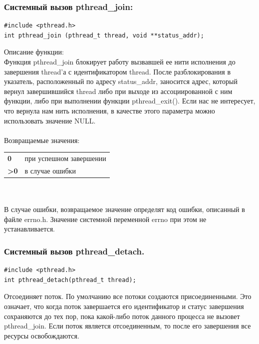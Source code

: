 \documentclass[a4paper]{article}
\begin{document}
\subsubsection{\Large Системный вызов pthread\_join:}
\begin{verbatim}
#include <pthread.h>
int pthread_join (pthread_t thread, void **status_addr);
\end{verbatim}
Описание функции:\\
Функция pthread\_join блокирует работу вызвавшей ее нити исполнения до завершения thread'а с идентификатором thread. После разблокирования в указатель, расположенный по адресу status\_addr, заносится адрес, который вернул завершившийся thread либо при выходе из ассоциированной с ним функции, либо при выполнении функции pthread\_exit(). Если нас не интересует, что вернула нам нить исполнения, в качестве этого параметра можно использовать значение NULL.\\\\
Возвращаемые значения:\\
\begin{tabular}{p{2cm}p{13cm}}
  \bf  0 & \rm при успешном завершении \\
  \bf >0 & \rm в случае ошибки \\
\end{tabular}
\\\\
В случае ошибки, возвращаемое значение определят код ошибки, описанный в файле errno.h. Значение системной переменной errno при этом не устанавливается.

\subsubsection{\Large Системный вызов pthread\_detach.}
\begin{verbatim}
#include <pthread.h>
int pthread_detach(pthread_t thread);
\end{verbatim}
Отсоединяет поток. По умолчанию все потоки создаются присоединенными. Это означает, что когда поток завершается его идентификатор и статус завершения сохраняются до тех пор, пока какой-либо поток данного процесса не вызовет pthread\_join. Если поток является отсоединенным, то после его завершения все ресурсы освобождаются.

\newpage
\end{document}
